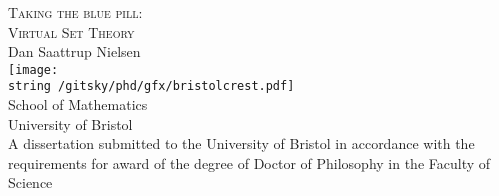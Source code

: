 \documentclass[../main]{subfiles}
\begin{document}
\begin{titlepage}
  \begin{center}
	  \vspace*{0.5cm}
    {\huge\textsc{Taking the blue pill:}}\\[0.4cm]
    {\Huge\textsc{Virtual Set Theory}}\\[0.4cm]
    {\LARGE Dan Saattrup Nielsen}\\[3.0cm]
    \texttt{[image: \\string~/gitsky/phd/gfx/bristolcrest.pdf]}\\
	  \vspace*{0.5cm}
    {\Large School of Mathematics}\\[0.2cm]
    {\Large\sc University of Bristol}\\[0.6cm]
	  \vspace*{\fill}
    {\large A dissertation submitted to the University of Bristol in accordance with the requirements for award of the degree of Doctor of Philosophy in the Faculty of Science}\\[0.5cm]
    {\large{}}
  \end{center}
\end{titlepage}

\noindent
\pagestyle{fancy}
\fancyhead[L]{\nouppercase\leftmark}
\fancyhead[R]{\nouppercase\rightmark}
\setlength\headsep{35pt}

\thispagestyle{empty}
\end{document}
